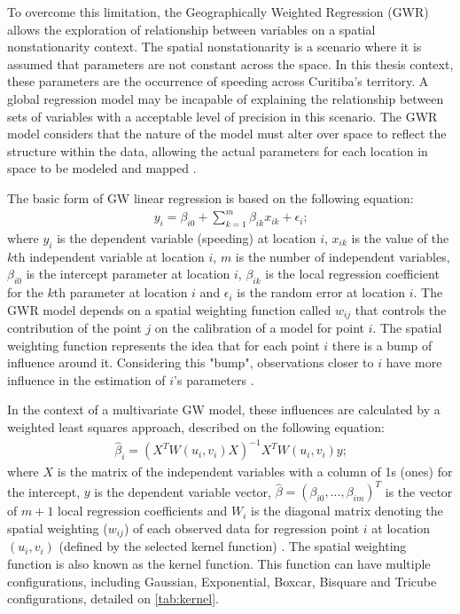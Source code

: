 
To overcome this limitation, the Geographically Weighted Regression (GWR) allows the exploration of relationship between variables on a spatial nonstationarity context. The spatial nonstationarity is a scenario where it is assumed that parameters are not constant across the space. In this thesis context, these parameters are the occurrence of speeding across Curitiba's territory. A global regression model may be incapable of explaining the relationship between sets of variables with a acceptable level of precision in this scenario. The GWR model considers that the nature of the model must alter over space to reflect the structure within the data, allowing the actual parameters for each location in space to be modeled and mapped \cite{Brunsdon2010}.

The basic form of GW linear regression is based on the following equation:\begin{align}
    y_i = \beta_{i0} + \sum_{k=1}^{m} \beta_{ik} x_{ik} + \epsilon_i \mbox{;}
    \label{eq:gwr}
\end{align} where $y_i$ is the dependent variable (speeding) at location $i$, $x_{ik}$ is the value of the $k$th independent variable at location $i$, $m$ is the number of independent variables, $\beta_{i0}$ is the intercept parameter at location $i$, $\beta_{ik}$ is the local regression coefficient for the $k$th parameter at location $i$ and $\epsilon_i$ is the random error at location $i$. The GWR model depends on a spatial weighting function called $w_{ij}$ that controls the contribution of the point $j$ on the calibration of a model for point $i$. The spatial weighting function represents the idea that for each point $i$ there is a bump of influence around it. Considering this "bump", observations closer to $i$ have more influence in the estimation of $i$'s parameters \cite{Brunsdon2010,Gollini2013}.

In the context of a multivariate GW model, these influences are calculated by a weighted least squares approach, described on the following equation: \begin{align}
    \hat{\beta}_i = (X^T W(u_i,v_i)X)^{-1} X^T W(u_i, v_i)y \mbox{;}
    \label{eq:wls}
\end{align} where $X$ is the matrix of the independent variables with a column of 1s (ones) for the intercept, $y$ is the dependent variable vector, $\hat{\beta} = (\beta_{i0},...,\beta_{im})^T$ is the vector of $m + 1$ local regression coefficients and $W_i$ is the diagonal matrix denoting the spatial weighting ($w_{ij}$) of each observed data for regression point $i$ at location $(u_i, v_i)$ (defined by the selected kernel function) \cite{Gollini2013}. The spatial weighting function is also known as the kernel function. This function can have multiple configurations, including Gaussian, Exponential, Boxcar, Bisquare and Tricube configurations, detailed on \autoref{tab:kernel}.

